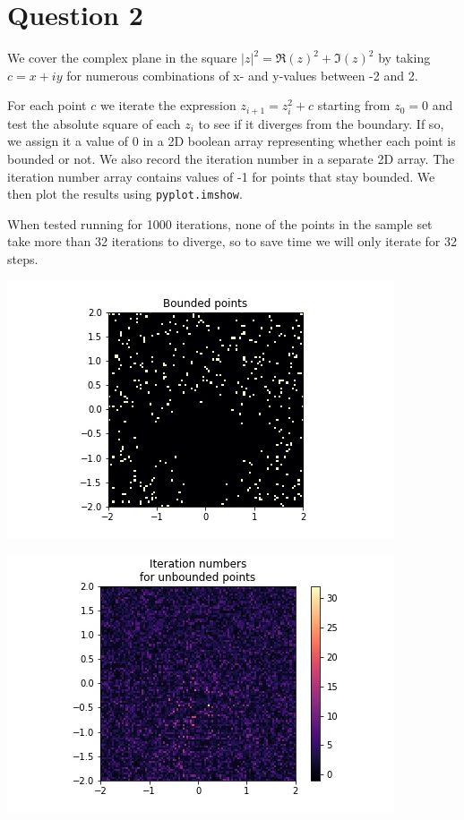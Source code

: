 \documentclass{article}
\begin{document}
\section*{Question 2}

We cover the complex plane in the square $|z|^2 = \Re(z)^2 + \Im(z)^2$ by taking $c = x + iy$ for numerous combinations of x- and y-values between -2 and 2.

For each point $c$ we iterate the expression $z_{i + 1} = z_i^2 + c$ starting from $z_0 = 0$ and test the absolute square of each $z_i$ to see if it diverges from the boundary. If so, we assign it a value of 0 in a 2D boolean array representing whether each point is bounded or not. We also record the iteration number in a separate 2D array. The iteration number array contains values of -1 for points that stay bounded. We then plot the results using \texttt{pyplot.imshow}.

When tested running for 1000 iterations, none of the points in the sample set take more than 32 iterations to diverge, so to save time we will only iterate for 32 steps.

\includegraphics[scale=0.75]{plot2_1}

\includegraphics[scale=0.75]{plot2_2}
\end{document}
